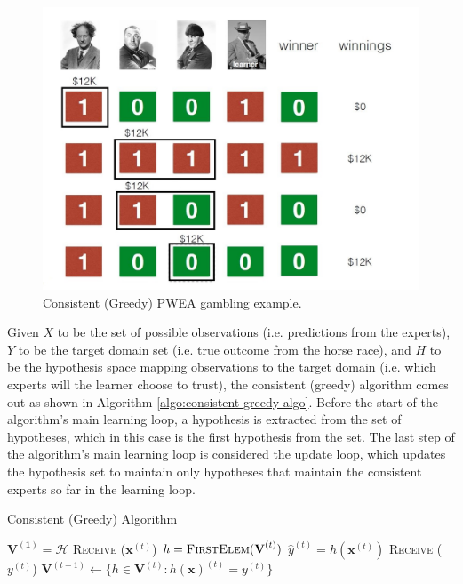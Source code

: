\documentclass[11pt]{article}
\begin{document}
\begin{figure}[H]
\centering
\includegraphics[width=4.5in]{greedy_gambling_example.JPG}
\caption{Consistent (Greedy) PWEA gambling example. }
\label{img:consistent-greedy-example}
\end{figure}

Given $X$ to be the set of possible observations (i.e. predictions from the experts), $Y$ to be the target domain set (i.e. true outcome from the horse race), and $H$ to be the hypothesis space mapping observations to the target domain (i.e. which experts will the learner choose to trust), the consistent (greedy) algorithm comes out as shown in Algorithm \ref{algo:consistent-greedy-algo}. Before the start of the algorithm's main learning loop, a hypothesis is extracted from the set of hypotheses, which in this case is the first hypothesis from the set. The last step of the algorithm's main learning loop is considered the update loop, which updates the hypothesis set to maintain only hypotheses that maintain the consistent experts so far in the learning loop. 

\begin{algorithm}[H]
\caption{Consistent (Greedy) Algorithm}
\label{algo:consistent-greedy-algo}
\begin{algorithmic}[1]
{\large
\STATE $\mathbf{V^{(1)}} = \mathcal{H}$  
\STATE \textsc{Receive} ($\textbf{x}^{(t)}$)
\STATE $h =\textsc{FirstElem}(\textbf{V}^{(t)}) $
\STATE $\hat{y}^{(t)} = h(\mathbf{x}^{(t)})$ 
\STATE \textsc{Receive} ($y^{(t)}$) 
\STATE $\mathbf{V}^{(t+1)}\leftarrow \{ h \in \mathbf{V}^{(t)} : h(\textbf{x})^{(t)}=y^{(t)} \}$
\ENDFOR }
\end{algorithmic}
\end{algorithm}
\end{document}
